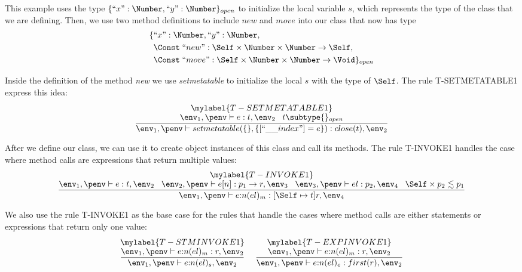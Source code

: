 This example uses the type $\{``x":\Number, ``y":\Number\}_{open}$ to
initialize the local variable $s$, which represents the type of the class
that we are defining.
Then, we use two method definitions to include $new$ and $move$ into
our class that now has type
\begin{align*}
\{ & ``x":\Number, ``y":\Number,\\
   & \Const \; ``new":\Self \times \Number \times \Number \rightarrow \Self,\\
   & \Const \; ``move":\Self \times \Number \times \Number \rightarrow \Void \}_{open}
\end{align*}

Inside the definition of the method \emph{new} we use \emph{setmetatable}
to initialize the local $s$ with the type of $\Self$.
The rule \textsc{T-SETMETATABLE1} express this idea:
\[
\begin{array}{c}
\mylabel{T-SETMETATABLE1}\\
\dfrac{\env_{1}, \penv \vdash e:t, \env_{2} \;\;\;
       t \subtype \{\}_{open}}
      {\env_{1}, \penv \vdash setmetatable(\{\}, \{[``\string_\string_index"] = e\}):close(t), \env_{2}}
\end{array}
\]

After we define our class, we can use it to create object instances
of this class and call its methods.
The rule \textsc{T-INVOKE1} handles the case where method calls
are expressions that return multiple values:
\[
\begin{array}{c}
\mylabel{T-INVOKE1}\\
\dfrac{\env_{1}, \penv \vdash e:t, \env_{2} \;\;\;
       \env_{2}, \penv \vdash e[n]:p_{1} \rightarrow r, \env_{3} \;\;\;
       \env_{3}, \penv \vdash el:p_{2}, \env_{4} \;\;\;
       \Self \times p_{2} \lesssim p_{1}}
      {\env_{1}, \penv \vdash e{:}n(el)_{m}:[\Self \mapsto t]r, \env_{4}}
\end{array}
\]

We also use the rule \textsc{T-INVOKE1} as the base case for the rules
that handle the cases where method calls are either statements
or expressions that return only one value:
\[
\begin{array}{c}
\begin{array}{c}
\mylabel{T-STMINVOKE1}\\
\dfrac{\env_{1}, \penv \vdash e{:}n(el)_{m}:r, \env_{2}}
      {\env_{1}, \penv \vdash e{:}n(el)_{s},\env_{2}}
\end{array}
\;
\begin{array}{c}
\mylabel{T-EXPINVOKE1}\\
\dfrac{\env_{1}, \penv \vdash e{:}n(el)_{m}:r, \env_{2}}
      {\env_{1}, \penv \vdash e{:}n(el)_{e}:first(r), \env_{2}}
\end{array}
\end{array}
\]

